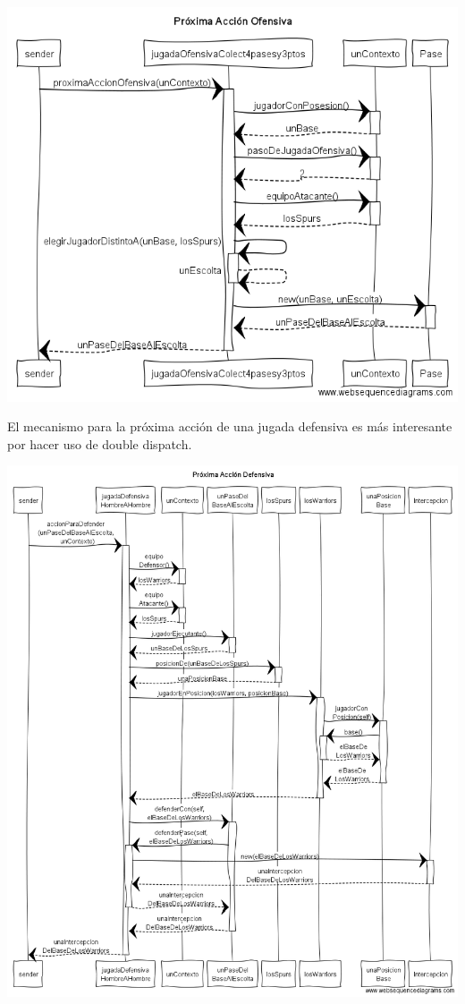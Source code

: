 \begin{center}
\includegraphics[scale=0.4]{diseno/Proxima_accion_ofensiva.png}
\end{center}

El mecanismo para la próxima acción de una jugada defensiva es más interesante por hacer uso de double dispatch.

\begin{center}
\includegraphics[scale=0.4]{diseno/Proxima_accion_defensiva.png}
\end{center}


